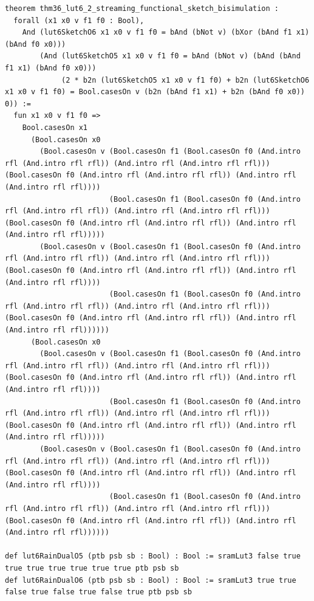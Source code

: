 \documentclass[11pt,letterpaper]{article}
\theoremstyle{spectralthm}
\begin{document}
\begin{lstlisting}[language=Lean4,caption={Standalone Pure Init.Prelude Term-Mode Lean 4 Kernel Suite (thm30--thm61, v0.0.0, 0 sorry, 0 axioms).},label={lst:lean_unified}]
theorem thm36_lut6_2_streaming_functional_sketch_bisimulation :
  forall (x1 x0 v f1 f0 : Bool),
    And (lut6SketchO6 x1 x0 v f1 f0 = bAnd (bNot v) (bXor (bAnd f1 x1) (bAnd f0 x0)))
        (And (lut6SketchO5 x1 x0 v f1 f0 = bAnd (bNot v) (bAnd (bAnd f1 x1) (bAnd f0 x0)))
             (2 * b2n (lut6SketchO5 x1 x0 v f1 f0) + b2n (lut6SketchO6 x1 x0 v f1 f0) = Bool.casesOn v (b2n (bAnd f1 x1) + b2n (bAnd f0 x0)) 0)) :=
  fun x1 x0 v f1 f0 =>
    Bool.casesOn x1
      (Bool.casesOn x0
        (Bool.casesOn v (Bool.casesOn f1 (Bool.casesOn f0 (And.intro rfl (And.intro rfl rfl)) (And.intro rfl (And.intro rfl rfl))) (Bool.casesOn f0 (And.intro rfl (And.intro rfl rfl)) (And.intro rfl (And.intro rfl rfl))))
                        (Bool.casesOn f1 (Bool.casesOn f0 (And.intro rfl (And.intro rfl rfl)) (And.intro rfl (And.intro rfl rfl))) (Bool.casesOn f0 (And.intro rfl (And.intro rfl rfl)) (And.intro rfl (And.intro rfl rfl)))))
        (Bool.casesOn v (Bool.casesOn f1 (Bool.casesOn f0 (And.intro rfl (And.intro rfl rfl)) (And.intro rfl (And.intro rfl rfl))) (Bool.casesOn f0 (And.intro rfl (And.intro rfl rfl)) (And.intro rfl (And.intro rfl rfl))))
                        (Bool.casesOn f1 (Bool.casesOn f0 (And.intro rfl (And.intro rfl rfl)) (And.intro rfl (And.intro rfl rfl))) (Bool.casesOn f0 (And.intro rfl (And.intro rfl rfl)) (And.intro rfl (And.intro rfl rfl))))))
      (Bool.casesOn x0
        (Bool.casesOn v (Bool.casesOn f1 (Bool.casesOn f0 (And.intro rfl (And.intro rfl rfl)) (And.intro rfl (And.intro rfl rfl))) (Bool.casesOn f0 (And.intro rfl (And.intro rfl rfl)) (And.intro rfl (And.intro rfl rfl))))
                        (Bool.casesOn f1 (Bool.casesOn f0 (And.intro rfl (And.intro rfl rfl)) (And.intro rfl (And.intro rfl rfl))) (Bool.casesOn f0 (And.intro rfl (And.intro rfl rfl)) (And.intro rfl (And.intro rfl rfl)))))
        (Bool.casesOn v (Bool.casesOn f1 (Bool.casesOn f0 (And.intro rfl (And.intro rfl rfl)) (And.intro rfl (And.intro rfl rfl))) (Bool.casesOn f0 (And.intro rfl (And.intro rfl rfl)) (And.intro rfl (And.intro rfl rfl))))
                        (Bool.casesOn f1 (Bool.casesOn f0 (And.intro rfl (And.intro rfl rfl)) (And.intro rfl (And.intro rfl rfl))) (Bool.casesOn f0 (And.intro rfl (And.intro rfl rfl)) (And.intro rfl (And.intro rfl rfl))))))

def lut6RainDualO5 (ptb psb sb : Bool) : Bool := sramLut3 false true true true true true true true ptb psb sb
def lut6RainDualO6 (ptb psb sb : Bool) : Bool := sramLut3 true true false true false true false true ptb psb sb


\end{lstlisting}
\end{document}
